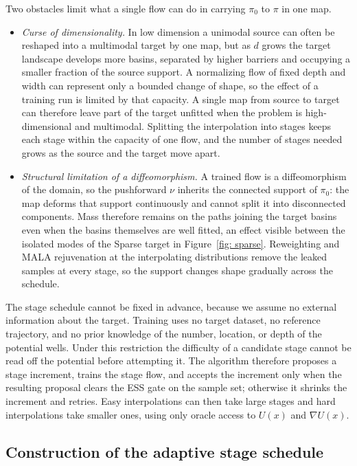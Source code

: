 \documentclass{article}
\begin{document}
Two obstacles limit what a single flow can do in carrying $\pi_0$ to $\pi$ in one map.

\begin{itemize}
    \item \emph{Curse of dimensionality.} In low dimension a unimodal source can often be reshaped into a multimodal target by one map, but as $d$ grows the target landscape develops more basins, separated by higher barriers and occupying a smaller fraction of the source support. A normalizing flow of fixed depth and width can represent only a bounded change of shape, so the effect of a training run is limited by that capacity. A single map from source to target can therefore leave part of the target unfitted when the problem is high-dimensional and multimodal. Splitting the interpolation into stages keeps each stage within the capacity of one flow, and the number of stages needed grows as the source and the target move apart.

    \item \emph{Structural limitation of a diffeomorphism.} A trained flow is a diffeomorphism of the domain, so the pushforward $\nu$ inherits the connected support of $\pi_0$: the map deforms that support continuously and cannot split it into disconnected components. Mass therefore remains on the paths joining the target basins even when the basins themselves are well fitted, an effect visible between the isolated modes of the Sparse target in Figure~\ref{fig: sparse}. Reweighting and MALA rejuvenation at the interpolating distributions remove the leaked samples at every stage, so the support changes shape gradually across the schedule.
\end{itemize}

The stage schedule cannot be fixed in advance, because we assume no external information about the target. Training uses no target dataset, no reference trajectory, and no prior knowledge of the number, location, or depth of the potential wells. Under this restriction the difficulty of a candidate stage cannot be read off the potential before attempting it. The algorithm therefore proposes a stage increment, trains the stage flow, and accepts the increment only when the resulting proposal clears the ESS gate on the sample set; otherwise it shrinks the increment and retries. Easy interpolations can then take large stages and hard interpolations take smaller ones, using only oracle access to $U(x)$ and $\nabla U(x)$.

\subsection{Construction of the adaptive stage schedule}
\end{document}
